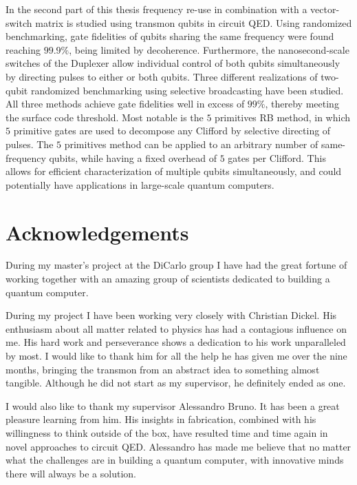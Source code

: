 \documentclass[12pt]{report}
\newcommand\blankpage{%
    \null
    \thispagestyle{empty}%
    \addtocounter{page}{-1}%
    \newpage}
\begin{document}
In the second part of this thesis frequency re-use in combination with a vector-switch matrix is studied using transmon qubits in circuit QED. Using randomized benchmarking, gate fidelities of qubits sharing the same frequency were found reaching $99.9\%$, being limited by decoherence. Furthermore, the nanosecond-scale switches of the Duplexer allow individual control of both qubits simultaneously by directing pulses to either or both qubits. Three different realizations of two-qubit randomized benchmarking using selective broadcasting have been studied. All three methods achieve gate fidelities well in excess of $99\%$, thereby meeting the surface code threshold. Most notable is the $5$ primitives RB method, in which $5$ primitive gates are used to decompose any Clifford by selective directing of pulses. The $5$ primitives method can be applied to an arbitrary number of same-frequency qubits, while having a fixed overhead of $5$ gates per Clifford. This allows for efficient characterization of multiple qubits simultaneously, and could potentially have applications in large-scale quantum computers.

\blankpage
\blankpage
\chapter*{Acknowledgements}

During my master's project at the DiCarlo group I have had the great fortune of working together with an amazing group of scientists dedicated to building a quantum computer.

During my project I have been working very closely with Christian Dickel. His enthusiasm about all matter related to physics has had a contagious influence on me. His hard work and perseverance shows a dedication to his work unparalleled by most. I would like to thank him for all the help he has given me over the nine months, bringing the transmon from an abstract idea to something almost tangible. Although he did not start as my supervisor, he definitely ended as one.

I would also like to thank my supervisor Alessandro Bruno. It has been a great pleasure learning from him. His insights in fabrication, combined with his willingness to think outside of the box, have resulted time and time again in novel approaches to circuit QED. Alessandro has made me believe that no matter what the challenges are in building a quantum computer, with innovative minds there will always be a solution.
\end{document}
